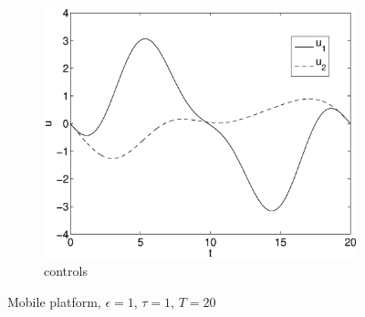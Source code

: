 \begin{figure}[h]
\begin{subfigure}[b]{\textwidth}
\centering
\includegraphics[height=0.3\textheight]{img/final_1_1_20_u.eps}
\caption{controls}
\end{subfigure}
\caption{Mobile platform, $\epsilon=1$, $\tau=1$, $T=20$}
\label{fig:pl8}
\end{figure}

